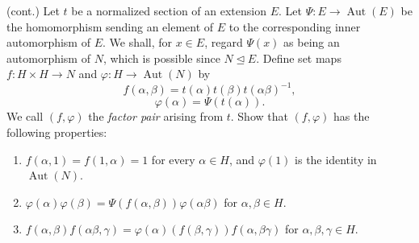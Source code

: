 \documentclass[../Odyssey_Project.tex]{subfiles}
\begin{document}
\begin{exercise}
\label{ex:2.13}
(cont.) Let $t$ be a normalized section of an extension $E$. Let $\Psi : E \to \operatorname{Aut}(E)$ be the homomorphism sending an element of $E$ to the corresponding inner automorphism of $E$. We shall, for $x \in E$, regard $\Psi(x)$ as being an automorphism of $N$, which is possible since $N \trianglelefteq E$. Define set maps $f : H \times H \to N$ and $\varphi : H \to \operatorname{Aut}(N)$ by
\[
f(\alpha, \beta) = t(\alpha) t(\beta) t(\alpha \beta)^{-1},
\]
\[
\varphi(\alpha) = \Psi(t(\alpha)).
\]
We call $(f, \varphi)$ the \emph{factor pair} arising from $t$. Show that $(f, \varphi)$ has the following properties:
\begin{enumerate}
    \item[1] $f(\alpha, 1) = f(1, \alpha) = 1$ for every $\alpha \in H$, and $\varphi(1)$ is the identity in $\operatorname{Aut}(N)$.
    \item[2] $\varphi(\alpha)\varphi(\beta) = \Psi(f(\alpha, \beta))\varphi(\alpha\beta)$ for $\alpha, \beta \in H$.
    \item[3] $f(\alpha, \beta) f(\alpha\beta, \gamma) = \varphi(\alpha)(f(\beta, \gamma)) f(\alpha, \beta\gamma)$ for $\alpha, \beta, \gamma \in H$.
\end{enumerate}
\end{exercise}
\end{document}

